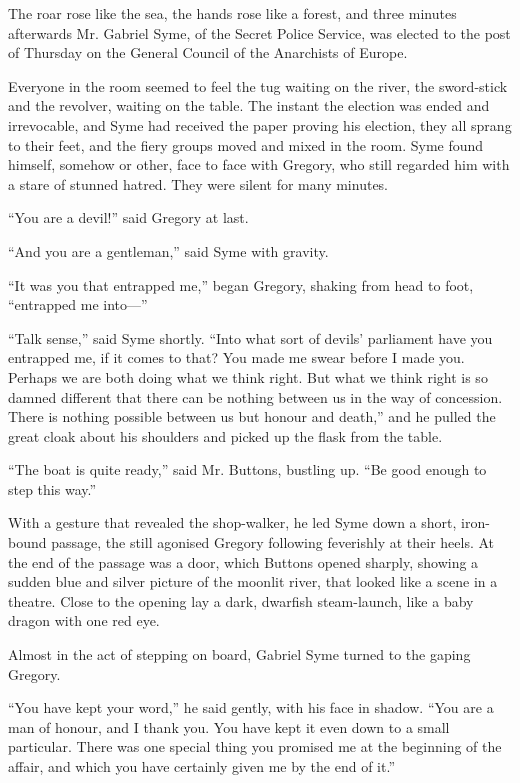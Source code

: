The roar rose like the sea, the hands rose like a forest, and three minutes afterwards Mr. Gabriel Syme, of the Secret Police Service, was elected to the post of Thursday on the General Council of the Anarchists of Europe.

Everyone in the room seemed to feel the tug waiting on the river, the sword-stick and the revolver, waiting on the table. The instant the election was ended and irrevocable, and Syme had received the paper proving his election, they all sprang to their feet, and the fiery groups moved and mixed in the room. Syme found himself, somehow or other, face to face with Gregory, who still regarded him with a stare of stunned hatred. They were silent for many minutes.

“You are a devil!” said Gregory at last.

“And you are a gentleman,” said Syme with gravity.

“It was you that entrapped me,” began Gregory, shaking from head to foot, “entrapped me into⁠—”

“Talk sense,” said Syme shortly. “Into what sort of devils’ parliament have you entrapped me, if it comes to that? You made me swear before I made you. Perhaps we are both doing what we think right. But what we think right is so damned different that there can be nothing between us in the way of concession. There is nothing possible between us but honour and death,” and he pulled the great cloak about his shoulders and picked up the flask from the table.

“The boat is quite ready,” said Mr. Buttons, bustling up. “Be good enough to step this way.”

With a gesture that revealed the shop-walker, he led Syme down a short, iron-bound passage, the still agonised Gregory following feverishly at their heels. At the end of the passage was a door, which Buttons opened sharply, showing a sudden blue and silver picture of the moonlit river, that looked like a scene in a theatre. Close to the opening lay a dark, dwarfish steam-launch, like a baby dragon with one red eye.

Almost in the act of stepping on board, Gabriel Syme turned to the gaping Gregory.

“You have kept your word,” he said gently, with his face in shadow. “You are a man of honour, and I thank you. You have kept it even down to a small particular. There was one special thing you promised me at the beginning of the affair, and which you have certainly given me by the end of it.”

